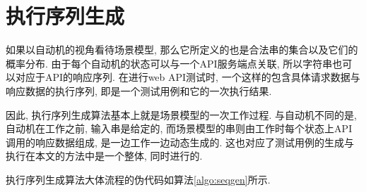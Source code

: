     \section{执行序列生成}
        如果以自动机的视角看待场景模型, 那么它所定义的也是合法串的集合以及它们的概率分布. 由于每个自动机的状态可以与一个API服务端点关联, 所以字符串也可以对应于API的响应序列. 在进行web API测试时, 一个这样的包含具体请求数据与响应数据的执行序列, 即是一个测试用例和它的一次执行结果.
        
        因此, 执行序列生成算法基本上就是场景模型的一次工作过程. 与自动机不同的是, 自动机在工作之前, 输入串是给定的, 而场景模型的串则由工作时每个状态上API调用的响应数据组成, 是一边工作一边动态生成的. 这也对应了测试用例的生成与执行在本文的方法中是一个整体, 同时进行的.
        
        执行序列生成算法大体流程的伪代码如算法\ref{algo:seqgen}所示.
        
